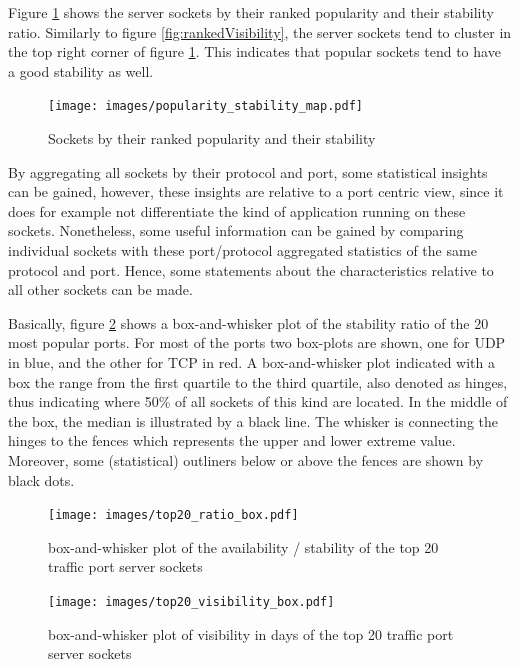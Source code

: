 Figure \ref{fig:rankedPopularity} shows the \glspl{server socket} by their ranked popularity and their stability ratio. 
Similarly to figure \ref{fig:rankedVisibility}, the \glspl{server socket} tend to cluster in the top right corner of figure \ref{fig:rankedPopularity}. This indicates that popular sockets tend to have a good stability as well. 

\begin{figure}
	[ht] \centering
	\texttt{[image: images/popularity\_stability\_map.pdf]}
	\caption{Sockets by their ranked popularity and their stability}
	\label{fig:rankedPopularity}
\end{figure}

By aggregating all sockets by their protocol and port, some statistical insights   can be gained, however, these insights are relative to a port centric view,  since it does for example not differentiate the kind of application running on  these sockets.
Nonetheless, some useful information can be gained by comparing individual sockets with these port/protocol aggregated statistics of the same protocol and port. 
Hence, some statements about the characteristics relative to all other sockets can be made.

Basically, figure \ref{fig:top20_ratio_box} shows a box-and-whisker plot of the stability ratio of the 20 most popular ports.
For most of the ports two box-plots are shown, one for \gls{UDP} in blue, and the other for \gls{TCP} in red. 
A box-and-whisker plot indicated with a box the range from the first quartile to the third quartile, also denoted as hinges, thus indicating where 50\% of all sockets of this kind are located.
In the middle of the box, the median is illustrated by a black line.
The whisker is connecting the hinges to the fences which represents the upper and lower extreme value. 
Moreover, some (statistical) outliners below or above the fences are shown by black dots.

\begin{landscape}
	\begin{figure}
	[p] \centering
	\texttt{[image: images/top20\_ratio\_box.pdf]}
	\caption{box-and-whisker plot of the availability / stability of the top 20 traffic port server sockets}
	\label{fig:top20_ratio_box}
\end{figure}
\end{landscape}

\begin{landscape}
\begin{figure}
	[p] \centering
	\texttt{[image: images/top20\_visibility\_box.pdf]}
	\caption{box-and-whisker plot of visibility in days of the top 20 traffic port server sockets}
	\label{fig:top20_visibledays_box}
\end{figure}
\end{landscape}

